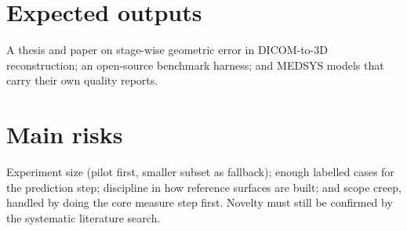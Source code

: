 \documentclass[10pt,a4paper]{article}
\begin{document}
\section{Expected outputs}
A thesis and paper on stage-wise geometric error in DICOM-to-3D reconstruction; an open-source benchmark harness; and MEDSYS models that carry their own quality reports.

\section{Main risks}
Experiment size (pilot first, smaller subset as fallback); enough labelled cases for the prediction step; discipline in how reference surfaces are built; and scope creep, handled by doing the core measure step first. Novelty must still be confirmed by the systematic literature search.
\end{document}
